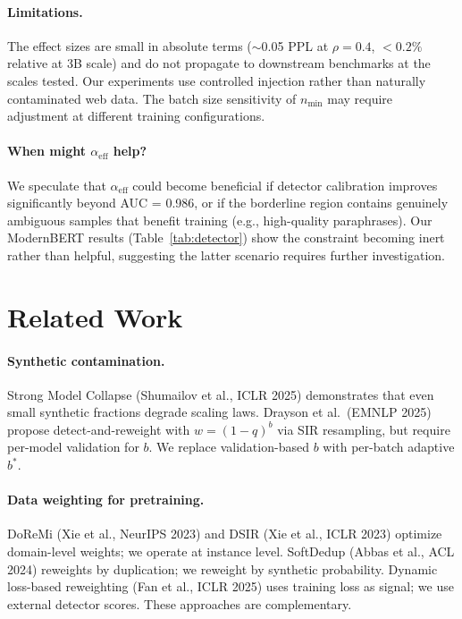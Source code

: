 \documentclass[11pt]{article}
\begin{document}
\paragraph{Limitations.}
The effect sizes are small in absolute terms ($\sim$0.05 PPL at $\rho = 0.4$, $< 0.2\%$ relative at 3B scale) and do not propagate to downstream benchmarks at the scales tested. Our experiments use controlled injection rather than naturally contaminated web data. The batch size sensitivity of $n_{\min}$ may require adjustment at different training configurations.

\paragraph{When might $\alpha_{\mathrm{eff}}$ help?}
We speculate that $\alpha_{\mathrm{eff}}$ could become beneficial if detector calibration improves significantly beyond AUC = 0.986, or if the borderline region contains genuinely ambiguous samples that benefit training (e.g., high-quality paraphrases). Our ModernBERT results (Table~\ref{tab:detector}) show the constraint becoming inert rather than helpful, suggesting the latter scenario requires further investigation.

\section{Related Work}
\label{sec:related}

\paragraph{Synthetic contamination.} Strong Model Collapse (Shumailov et al., ICLR 2025) demonstrates that even small synthetic fractions degrade scaling laws. Drayson et al.\ (EMNLP 2025) propose detect-and-reweight with $w = (1-q)^b$ via SIR resampling, but require per-model validation for $b$. We replace validation-based $b$ with per-batch adaptive $b^*$.

\paragraph{Data weighting for pretraining.} DoReMi (Xie et al., NeurIPS 2023) and DSIR (Xie et al., ICLR 2023) optimize domain-level weights; we operate at instance level. SoftDedup (Abbas et al., ACL 2024) reweights by duplication; we reweight by synthetic probability. Dynamic loss-based reweighting (Fan et al., ICLR 2025) uses training loss as signal; we use external detector scores. These approaches are complementary.
\end{document}
